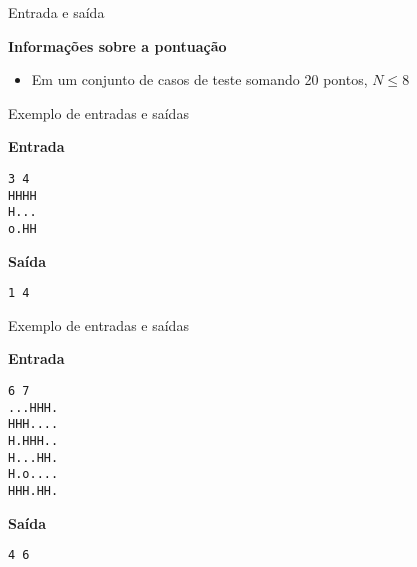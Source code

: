 \begin{frame}[fragile]{Entrada e saída}

\textbf{Informações sobre a pontuação}

\begin{itemize}
    \item Em um conjunto de casos de teste somando 20 pontos, $N\leq 8$
\end{itemize}
\end{frame}

\begin{frame}[fragile]{Exemplo de entradas e saídas}

\begin{minipage}[t]{0.45\textwidth}
\textbf{Entrada}
\begin{verbatim}
3 4
HHHH
H...
o.HH
\end{verbatim}
\end{minipage}
\begin{minipage}[t]{0.5\textwidth}
\textbf{Saída}
\begin{verbatim}
1 4
\end{verbatim}
\end{minipage}
\end{frame}

\begin{frame}[fragile]{Exemplo de entradas e saídas}

\begin{minipage}[t]{0.45\textwidth}
\textbf{Entrada}
\begin{verbatim}
6 7
...HHH.
HHH....
H.HHH..
H...HH.
H.o....
HHH.HH.
\end{verbatim}
\end{minipage}
\begin{minipage}[t]{0.5\textwidth}
\textbf{Saída}
\begin{verbatim}
4 6
\end{verbatim}
\end{minipage}
\end{frame}


